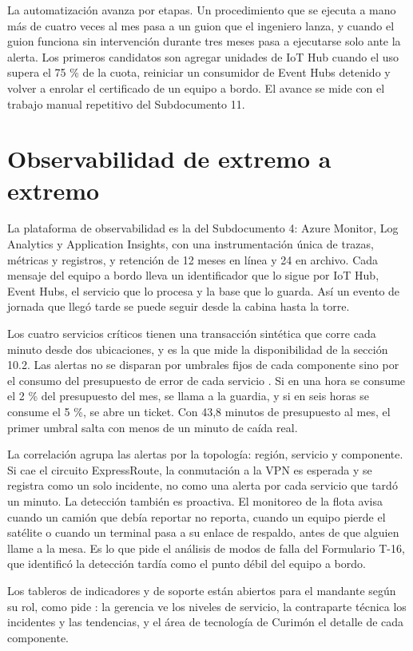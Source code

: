 La automatización avanza por etapas. Un procedimiento que se ejecuta a mano más de cuatro veces al mes
pasa a un guion que el ingeniero lanza, y cuando el guion funciona sin intervención durante tres meses
pasa a ejecutarse solo ante la alerta. Los primeros candidatos son agregar unidades de IoT Hub cuando
el uso supera el 75 \% de la cuota, reiniciar un consumidor de Event Hubs detenido y volver a enrolar el
certificado de un equipo a bordo. El avance se mide con el trabajo manual repetitivo del Subdocumento
11.

\section{Observabilidad de extremo a extremo}\label{sec:10-observabilidad-de-extremo-a-extr}

La plataforma de observabilidad es la del Subdocumento 4: Azure Monitor, Log Analytics y Application
Insights, con una instrumentación única de trazas, métricas y registros, y retención de 12 meses en línea
y 24 en archivo. Cada mensaje del equipo a bordo lleva un identificador que lo sigue por IoT Hub, Event
Hubs, el servicio que lo procesa y la base que lo guarda. Así un evento de jornada que llegó tarde se
puede seguir desde la cabina hasta la torre.

Los cuatro servicios críticos tienen una transacción sintética que corre cada minuto desde dos
ubicaciones, y es la que mide la disponibilidad de la sección 10.2. Las alertas no se disparan por
umbrales fijos de cada componente sino por el consumo del presupuesto de error de cada servicio
\parencite{beyer2016}. Si en una hora se consume el 2 \% del presupuesto del mes, se llama a la guardia,
y si en seis horas se consume el 5 \%, se abre un ticket. Con 43,8 minutos de presupuesto al mes, el
primer umbral salta con menos de un minuto de caída real.

La correlación agrupa las alertas por la topología: región, servicio y componente. Si cae el circuito
ExpressRoute, la conmutación a la VPN es esperada y se registra como un solo incidente, no como una
alerta por cada servicio que tardó un minuto. La detección también es proactiva. El monitoreo de la
flota avisa cuando un camión que debía reportar no reporta, cuando un equipo pierde el satélite o cuando
un terminal pasa a su enlace de respaldo, antes de que alguien llame a la mesa. Es lo que pide el
análisis de modos de falla del Formulario T-16, que identificó la detección tardía como el punto débil
del equipo a bordo.

Los tableros de indicadores y de soporte están abiertos para el mandante según su rol, como pide
: la gerencia ve los niveles de servicio, la contraparte técnica los incidentes y
las tendencias, y el área de tecnología de Curimón el detalle de cada componente.
